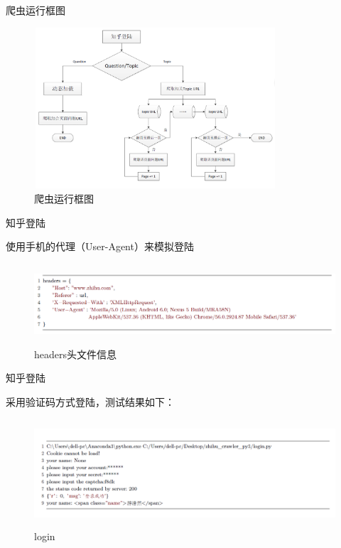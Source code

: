 \documentclass[aspectratio=169]{beamer}
\begin{document}
\begin{frame}{爬虫运行框图}
\begin{figure}
  \centering
  \includegraphics[width=9cm,height=6cm]{爬虫运行框图}
  \caption{爬虫运行框图}
\end{figure}
\end{frame}

\begin{frame}{知乎登陆}
\begin{block}{使用手机的代理（User-Agent）来模拟登陆}\end{block}
\begin{figure}
  \centering
  \includegraphics[width=15cm,height=3cm]{headers}
  \caption{headers头文件信息}
\end{figure}
\end{frame}

\begin{frame}{知乎登陆}
\begin{block}{采用验证码方式登陆，测试结果如下：}\end{block}
\begin{figure}
  \centering
  \includegraphics[width=13cm,height=4cm]{login}
  \caption{login}
\end{figure}
\end{frame}
\end{document}
